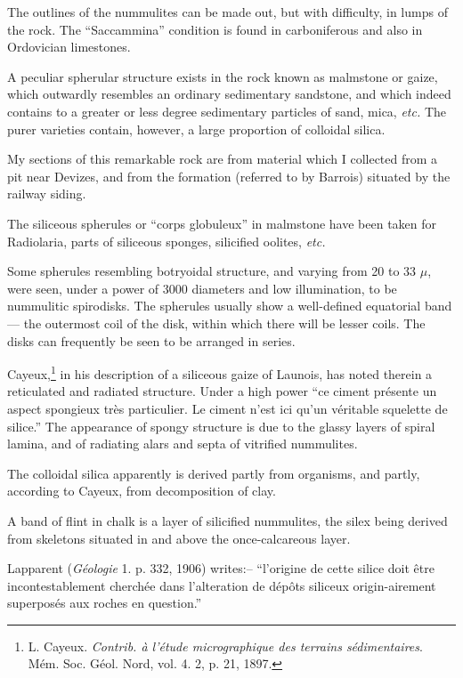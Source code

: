 \documentclass[a4paper, 12pt, oneside]{article}
\begin{document}
The outlines of the nummulites can be made out, but with difficulty, in lumps of the rock. The ``Saccammina'' condition is found in carboniferous and also in Ordovician limestones.

A peculiar spherular structure exists in the rock known as malmstone or gaize, which outwardly resembles an ordinary sedimentary sandstone, and which indeed contains to a greater or less degree sedimentary particles of sand, mica, \emph{etc.} The purer varieties contain, however, a large proportion of colloidal silica.

My sections of this remarkable rock are from material which I collected from a pit near Devizes, and from the formation (referred to by Barrois) situated by the railway siding.

The siliceous spherules or ``corps globuleux'' in malmstone have been taken for Radiolaria, parts of siliceous sponges, silicified oolites, \emph{etc.}

Some spherules resembling botryoidal structure, and varying from 20 to 33 $\mu$, were seen, under a power of 3000 diameters and low illumination, to be nummulitic spirodisks. The spherules usually show a well-defined equatorial band --- the outermost coil of the disk, within which there will be lesser coils. The disks can frequently be seen to be arranged in series.

Cayeux,\footnote{L. Cayeux. \emph{Contrib. à l'étude micrographique des terrains sédimentaires}. Mém. Soc. Géol. Nord, vol. 4. 2, p. 21, 1897.} in his description of a siliceous gaize of Launois, has noted therein a reticulated and radiated structure. Under a high power ``ce ciment présente un aspect spongieux très particulier. Le ciment n'est ici qu'un véritable squelette de silice.'' The appearance of spongy structure is due to the glassy layers of spiral lamina, and of radiating alars and septa of vitrified nummulites.

The colloidal silica apparently is derived partly from organisms, and partly, according to Cayeux, from decomposition of clay.

A band of flint in chalk is a layer of silicified nummulites, the silex being derived from skeletons situated in and above the once-calcareous layer.

Lapparent (\emph{Géologie} 1. p. 332, 1906) writes:-- ``l'origine de cette silice doit être incontestablement cherchée dans l'alteration de dépôts siliceux origin-airement superposés aux roches en question.''
\end{document}
